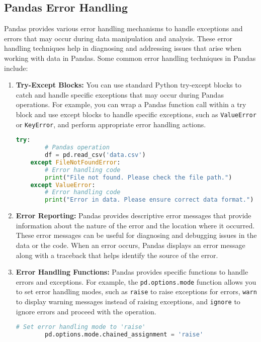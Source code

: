 \subsection{Pandas Error Handling}

Pandas provides various error handling mechanisms to handle exceptions and errors that may occur during data manipulation and analysis. These error handling techniques help in diagnosing and addressing issues that arise when working with data in Pandas. Some common error handling techniques in Pandas include:

\begin{enumerate}
	\item \textbf{Try-Except Blocks:} You can use standard Python try-except blocks to catch and handle specific exceptions that may occur during Pandas operations. For example, you can wrap a Pandas function call within a try block and use except blocks to handle specific exceptions, such as \texttt{ValueError} or \texttt{KeyError}, and perform appropriate error handling actions.
	
	\begin{lstlisting}[language=Python]
	try:
		# Pandas operation
		df = pd.read_csv('data.csv')
	except FileNotFoundError:
		# Error handling code
		print("File not found. Please check the file path.")
	except ValueError:
		# Error handling code
		print("Error in data. Please ensure correct data format.")
	\end{lstlisting}
	
	\item \textbf{Error Reporting:} Pandas provides descriptive error messages that provide information about the nature of the error and the location where it occurred. These error messages can be useful for diagnosing and debugging issues in the data or the code. When an error occurs, Pandas displays an error message along with a traceback that helps identify the source of the error.
	
	\item \textbf{Error Handling Functions:} Pandas provides specific functions to handle errors and exceptions. For example, the \texttt{pd.options.mode} function allows you to set error handling modes, such as \texttt{raise} to raise exceptions for errors, \texttt{warn} to display warning messages instead of raising exceptions, and \texttt{ignore} to ignore errors and proceed with the operation.
	
	\begin{lstlisting}[language=Python]
		# Set error handling mode to 'raise'
		pd.options.mode.chained_assignment = 'raise'
		

\end{lstlisting}
\end{enumerate}
